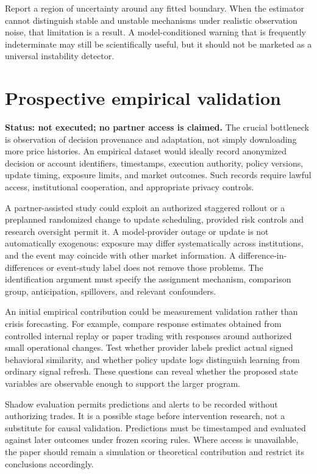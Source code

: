 \documentclass[11pt,a4paper]{article}
\theoremstyle{definition}
\theoremstyle{remark}
\begin{document}
Report a region of uncertainty around any fitted boundary. When the estimator cannot distinguish stable and unstable mechanisms under realistic observation noise, that limitation is a result. A model-conditioned warning that is frequently indeterminate may still be scientifically useful, but it should not be marketed as a universal instability detector.

\section{Prospective empirical validation}
\label{sec:empirical}
\textbf{Status: not executed; no partner access is claimed.} The crucial bottleneck is observation of decision provenance and adaptation, not simply downloading more price histories. An empirical dataset would ideally record anonymized decision or account identifiers, timestamps, execution authority, policy versions, update timing, exposure limits, and market outcomes. Such records require lawful access, institutional cooperation, and appropriate privacy controls.

A partner-assisted study could exploit an authorized staggered rollout or a preplanned randomized change to update scheduling, provided risk controls and research oversight permit it. A model-provider outage or update is not automatically exogenous: exposure may differ systematically across institutions, and the event may coincide with other market information. A difference-in-differences or event-study label does not remove those problems. The identification argument must specify the assignment mechanism, comparison group, anticipation, spillovers, and relevant confounders.

An initial empirical contribution could be measurement validation rather than crisis forecasting. For example, compare response estimates obtained from controlled internal replay or paper trading with responses around authorized small operational changes. Test whether provider labels predict actual signed behavioral similarity, and whether policy update logs distinguish learning from ordinary signal refresh. These questions can reveal whether the proposed state variables are observable enough to support the larger program.

Shadow evaluation permits predictions and alerts to be recorded without authorizing trades. It is a possible stage before intervention research, not a substitute for causal validation. Predictions must be timestamped and evaluated against later outcomes under frozen scoring rules. Where access is unavailable, the paper should remain a simulation or theoretical contribution and restrict its conclusions accordingly.
\end{document}
